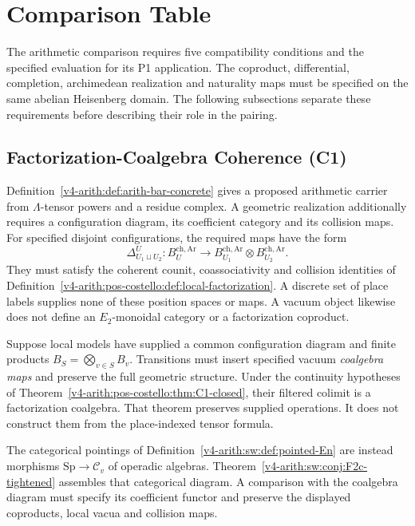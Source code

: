 \section{Comparison Table}
\label{v4-arith:pos-costello:obstruction-analysis}

The arithmetic comparison requires five compatibility conditions
and the specified evaluation for its P1 application. The coproduct, differential, completion,
archimedean realization and naturality maps must be specified on the
same abelian Heisenberg domain. The following subsections separate
these requirements before describing their role in the pairing.

\subsection{Factorization-Coalgebra Coherence (C1)}

Definition~\ref{v4-arith:def:arith-bar-concrete} gives a proposed
arithmetic carrier from \(\Lambda\)-tensor powers and a residue
complex. A geometric realization additionally requires a
configuration diagram, its coefficient category and its collision
maps. For specified disjoint configurations, the required maps
have the form
\[
 \Delta_{U_1\sqcup U_2}^{U}:
 B_U^{\mathrm{ch,Ar}}\longrightarrow
 B_{U_1}^{\mathrm{ch,Ar}}\otimes B_{U_2}^{\mathrm{ch,Ar}}.
\]
They must satisfy the coherent counit, coassociativity and
collision identities of
Definition~\ref{v4-arith:pos-costello:def:local-factorization}.
A discrete set of place labels supplies none of these position
spaces or maps. A vacuum object likewise does not define an
\(E_2\)-monoidal category or a factorization coproduct.

Suppose local models have supplied a common configuration diagram
and finite products \(B_S=\bigotimes_{v\in S}B_v\).
Transitions must insert specified vacuum \emph{coalgebra maps}
and preserve the full geometric structure. Under the continuity
hypotheses of Theorem~\ref{v4-arith:pos-costello:thm:C1-closed},
their filtered colimit is a factorization coalgebra.
That theorem preserves supplied operations. It does not
construct them from the place-indexed tensor formula.

The categorical pointings of
Definition~\ref{v4-arith:sw:def:pointed-En} are instead morphisms
\(\mathrm{Sp}\to\mathcal C_v\) of operadic algebras.
Theorem~\ref{v4-arith:sw:conj:F2c-tightened} assembles that
categorical diagram. A comparison with the coalgebra diagram
must specify its coefficient functor and preserve the displayed
coproducts, local vacua and collision maps.

